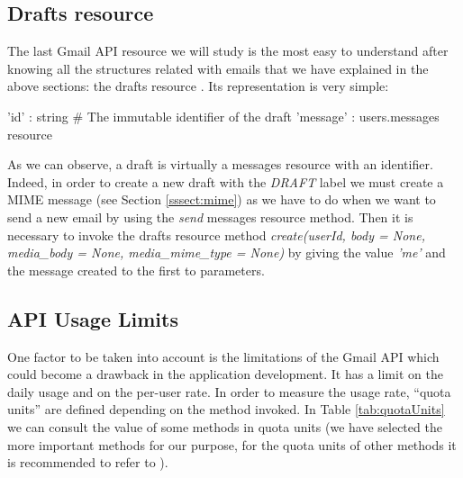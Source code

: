\subsection{Drafts resource}\label{ssect:drafts}
The last Gmail API resource we will study is the most easy to understand after knowing all the structures related with emails that we have explained in the above sections: the drafts resource \citep[/v1/reference/users/drafts]{gmailAPI}. Its representation is very simple:

\begin{python}
	{
		'id' : string # The immutable identifier of the draft
		'message' : users.messages resource
	}
\end{python}

As we can observe, a draft is virtually a messages resource with an identifier. Indeed, in order to create a new draft with the \textit{DRAFT} label we must create a MIME message (see Section \ref{sssect:mime}) as we have to do when we want to send a new email by using the \textit{send} messages resource method. Then it is necessary to invoke the drafts resource method \textit{create(userId, body = None, media\_body = None, media\_mime\_type = None)} by giving the value \textit{'me'} and the message created to the first to parameters.

\subsection{API Usage Limits} \label{ssect:apilimits}
One factor to be taken into account is the limitations of the Gmail API \citep[/v1/reference/quota]{gmailAPI} which could become a drawback in the application development. It has a limit on the daily usage and on the per-user rate. In order to measure the usage rate, ``quota units'' are defined depending on the method invoked. In Table \ref{tab:quotaUnits} we can consult the value of some methods in quota units (we have selected the more important methods for our purpose, for the quota units of other methods it is recommended to refer to \cite[/v1/reference/quota]{gmailAPI}).

